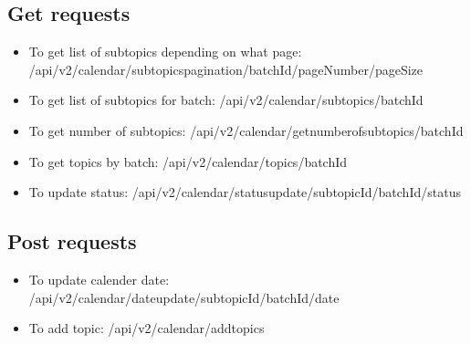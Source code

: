 \subsection{Get requests}
\begin{itemize}
    \item To get list of subtopics depending on what page: /api/v2/calendar/subtopicspagination/{batchId}/{pageNumber}/{pageSize}
    \item To get list of subtopics for batch: /api/v2/calendar/subtopics/{batchId}
    \item To get number of subtopics: /api/v2/calendar/getnumberofsubtopics/{batchId}
    \item To get topics by batch: /api/v2/calendar/topics/{batchId}
    \item To update status: /api/v2/calendar/statusupdate/{subtopicId}/{batchId}/{status}
\end{itemize}
\subsection{Post requests}
\begin{itemize}
    \item To update calender date: /api/v2/calendar/dateupdate/{subtopicId}/{batchId}/{date}
    \item To add topic: /api/v2/calendar/addtopics
\end{itemize}